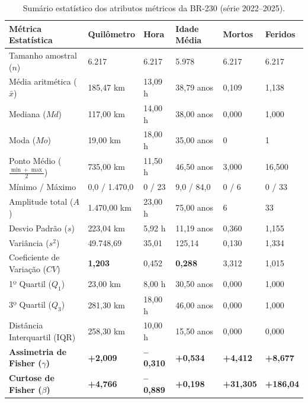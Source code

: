 \documentclass[11pt,a4paper]{article}
\begin{document}
\begin{table}[H]
  \centering
  \small
  \renewcommand{\arraystretch}{1.2}
  \caption{Sumário estatístico dos atributos métricos da BR-230 (série 2022--2025).}
  \label{tab:estatisticas_eda}
  \begin{tabularx}{\textwidth}{|>{\raggedright\arraybackslash}p{4.6cm}|Y|Y|Y|Y|Y|}
    \hline
    \textbf{Métrica Estatística} & \textbf{Quilômetro} & \textbf{Hora} & \textbf{Idade Média} & \textbf{Mortos} & \textbf{Feridos} \\
    \hline
    Tamanho amostral ($n$) & 6.217 & 6.217 & 5.978 & 6.217 & 6.217 \\
    \hline
    Média aritmética ($\bar{x}$) & 185,47 km & 13,09 h & 38,79 anos & 0,109 & 1,138 \\
    \hline
    Mediana ($Md$) & 117,00 km & 14,00 h & 38,00 anos & 0,000 & 1,000 \\
    \hline
    Moda ($Mo$) & 19,00 km & 18,00 h & 35,00 anos & 0 & 1 \\
    \hline
    Ponto Médio ($\frac{\min+\max}{2}$) & 735,00 km & 11,50 h & 46,50 anos & 3,000 & 16,500 \\
    \hline
    Mínimo / Máximo & 0,0 / 1.470,0 & 0 / 23 & 9,0 / 84,0 & 0 / 6 & 0 / 33 \\
    \hline
    Amplitude total ($A$) & 1.470,00 km & 23,00 h & 75,00 anos & 6 & 33 \\
    \hline
    Desvio Padrão ($s$) & 223,04 km & 5,92 h & 11,19 anos & 0,360 & 1,155 \\
    \hline
    Variância ($s^2$) & 49.748,69 & 35,01 & 125,14 & 0,130 & 1,334 \\
    \hline
    Coeficiente de Variação ($CV$) & \textbf{1,203} & 0,452 & \textbf{0,288} & 3,312 & 1,015 \\
    \hline
    1º Quartil ($Q_1$) & 23,00 km & 8,00 h & 30,50 anos & 0,000 & 1,000 \\
    \hline
    3º Quartil ($Q_3$) & 281,30 km & 18,00 h & 46,00 anos & 0,000 & 1,000 \\
    \hline
    Distância Interquartil ($\text{IQR}$) & 258,30 km & 10,00 h & 15,50 anos & 0,000 & 0,000 \\
    \hline
    \textbf{Assimetria de Fisher ($\gamma$)} & \textbf{+2,009} & \textbf{--0,310} & \textbf{+0,534} & \textbf{+4,412} & \textbf{+8,677} \\
    \hline
    \textbf{Curtose de Fisher ($\beta$)} & \textbf{+4,766} & \textbf{--0,889} & \textbf{+0,198} & \textbf{+31,305} & \textbf{+186,04} \\
    \hline
  \end{tabularx}
\end{table}
\end{document}
